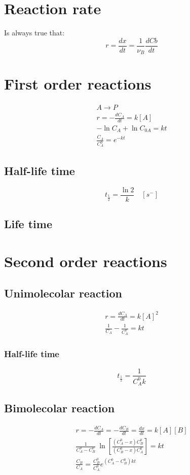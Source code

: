 \documentclass[Master.tex]{subfiles}
\begin{document}
\begin{multicols}{2}
		 \section{Reaction rate}
		  Is always true that:
		  \[
				   r = \frac{dx}{dt} = \frac{1}{\nu _{B} } \frac{dCb}{dt}
		  \]
		 \section{First order reactions}
		  \begin{gather*}
				   A \to P \\
				   r = -\frac{dC_{A}}{dt} = k[A]\\
				   - \ln C_{A} + \ln C_{0A} = kt\\
				   \frac{C_{A} }{C_{A}^{0} } = e^{-kt}
		  \end{gather*}

		  \subsection{Half-life time}
				   \[
						    t_{\frac{1}{2}} = \frac{\ln2}{k} \quad [s^{-}]
				   \]

		  \subsection{Life time}

		 \section{Second order reactions}
		  \subsection{Unimolecolar reaction}
				   \begin{gather*}
						    r = \frac{dC_{A}}{dt} = k[A]^{2} \\
						    \frac{1}{C_{A} } - \frac{1}{C_{A} ^{0}} = kt
				   \end{gather*}
				   \subsubsection{Half-life time}
						    \[
								     t_{\frac{1}{2}} = \frac{1}{C_{A} ^{0}k}
						    \]

		  \subsection{Bimolecolar reaction}
				   \begin{gather*}
						    r = - \frac{dC_{A}}{dt} = - \frac{dC_{B}}{dt} = \frac{dx}{dt} = k[A][B] \\
						    \frac{1}{C_{A} ^{0} - C_{B} ^{0} }~\ln\left[\frac{(C_{A} ^{0} - x)C_{B} ^{0} }{(C_{B} ^{0} - x) C_{A} ^{0} }\right] = kt\\
						    \frac{C_{B}}{C_{A}} = \frac{C_{B} ^{0} }{C_{A} ^{0} }e^{(C_{A} ^{0}-C_{B} ^{0}  )kt}
				   \end{gather*}


\end{multicols}
\end{document}
